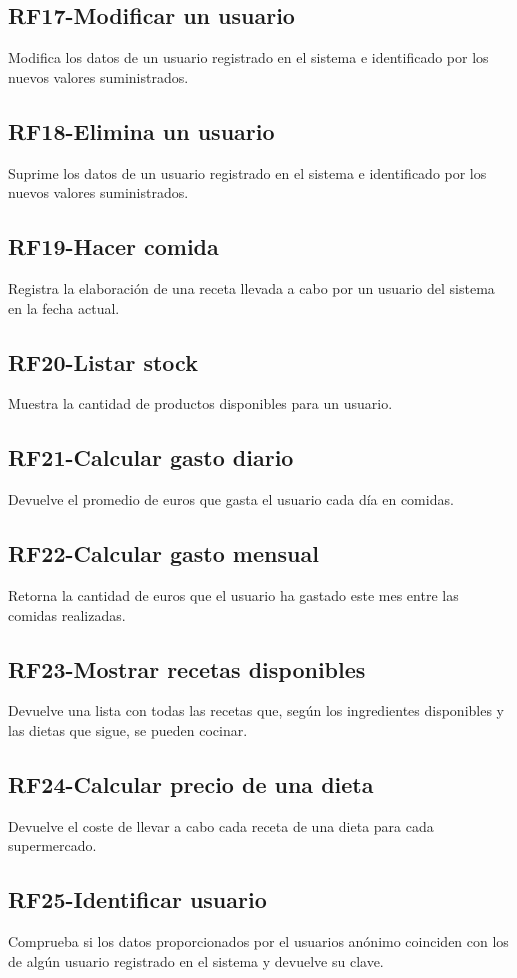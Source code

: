 \documentclass[a4paper,12pt]{report}
\begin{document}
\subsection{\textbf{RF17-Modificar un usuario}}
\label{sec-2-2-17}
Modifica los datos de un usuario registrado en el sistema e identificado por los nuevos valores suministrados.
\subsection{\textbf{RF18-Elimina un usuario}}
\label{sec-2-2-18}
Suprime los datos de un usuario registrado en el sistema e identificado por los nuevos valores suministrados.
\subsection{\textbf{RF19-Hacer comida}}
\label{sec-2-2-19}
Registra la elaboración de una receta llevada a cabo por un usuario del sistema en la fecha actual.
\subsection{\textbf{RF20-Listar stock}}
\label{sec-2-2-20}
Muestra la cantidad de productos disponibles para un usuario.
\subsection{\textbf{RF21-Calcular gasto diario}}
\label{sec-2-2-21}
Devuelve el promedio de euros que gasta el usuario cada día en comidas.
\subsection{\textbf{RF22-Calcular gasto mensual}}
\label{sec-2-2-22}
Retorna la cantidad de euros que el usuario ha gastado este mes entre las comidas realizadas.
\subsection{\textbf{RF23-Mostrar recetas disponibles}}
\label{sec-2-2-23}
Devuelve una lista con todas las recetas que, según los ingredientes disponibles y las dietas que sigue, se pueden cocinar.
\subsection{\textbf{RF24-Calcular precio de una dieta}}
\label{sec-2-2-24}
Devuelve el coste de llevar a cabo cada receta de una dieta para cada supermercado.
\subsection{\textbf{RF25-Identificar usuario}}
\label{sec-2-2-25}
Comprueba si los datos proporcionados por el usuarios anónimo coinciden con los de algún usuario registrado en el sistema y devuelve su clave.
\end{document}
